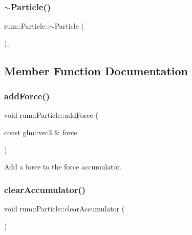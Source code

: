 \mbox{\label{classrum_1_1_particle_abc143197fe05fa60a1a3ccbf7b5f0fe8}} 
\subsubsection{\texorpdfstring{$\sim$\+Particle()}{~Particle()}}
{\footnotesize\ttfamily rum\+::\+Particle\+::$\sim$\+Particle (\begin{DoxyParamCaption}{ }\end{DoxyParamCaption})\hspace{0.3cm}{\ttfamily [virtual]}, {\ttfamily [default]}}



\subsection{Member Function Documentation}
\mbox{\label{classrum_1_1_particle_a70292de889740fba9fd0624f4a88bf91}} 
\subsubsection{\texorpdfstring{add\+Force()}{addForce()}}
{\footnotesize\ttfamily void rum\+::\+Particle\+::add\+Force (\begin{DoxyParamCaption}\item[{const glm\+::vec3 \&}]{force }\end{DoxyParamCaption})}

Add a force to the force accumulator. \mbox{\label{classrum_1_1_particle_a6d3aa962929ee699bf324330dc3ebf69}} 
\subsubsection{\texorpdfstring{clear\+Accumulator()}{clearAccumulator()}}
{\footnotesize\ttfamily void rum\+::\+Particle\+::clear\+Accumulator (\begin{DoxyParamCaption}{ }\end{DoxyParamCaption})}

